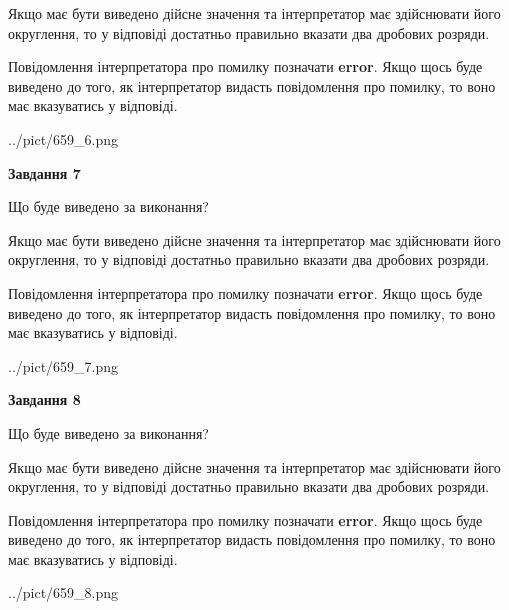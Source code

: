 \documentclass[12pt, ukrainian]{article}
\begin{document}
{\begin {Large}
Якщо має бути виведено дійсне значення та інтерпретатор має здійснювати його округлення, 
то у відповіді достатньо правильно вказати два дробових розряди.

Повідомлення інтерпретатора про помилку позначати \textbf{error}.
Якщо щось буде виведено до того, як інтерпретатор видасть повідомлення про помилку, 
то воно має вказуватись у відповіді. \par

\begin{center}
	{../pict/659_6.png}
\end{center}
\newpage

{\begin {center}\textbf{Завдання 7}\end {center}}\par
Що буде виведено за виконання? \par

Якщо має бути виведено дійсне значення та інтерпретатор має здійснювати його округлення, 
то у відповіді достатньо правильно вказати два дробових розряди.

Повідомлення інтерпретатора про помилку позначати \textbf{error}.
Якщо щось буде виведено до того, як інтерпретатор видасть повідомлення про помилку, 
то воно має вказуватись у відповіді. \par

\begin{center}
	{../pict/659_7.png}
\end{center}
\newpage

{\begin {center}\textbf{Завдання 8}\end {center}}\par
Що буде виведено за виконання? \par

Якщо має бути виведено дійсне значення та інтерпретатор має здійснювати його округлення, 
то у відповіді достатньо правильно вказати два дробових розряди.

Повідомлення інтерпретатора про помилку позначати \textbf{error}.
Якщо щось буде виведено до того, як інтерпретатор видасть повідомлення про помилку, 
то воно має вказуватись у відповіді. \par

\begin{center}
	{../pict/659_8.png}
\end{center}
\newpage


\end{Large}}
\end{document}
